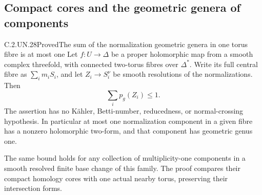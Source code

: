 \subsection{Compact cores and the geometric genera of components}

\begin{statement}{C.2.UN.28}{Proved}{The sum of the normalization geometric genera in one torus fibre is at most one}
Let $f:U\to\Delta$ be a proper holomorphic map from a
smooth complex threefold, with connected two-torus
fibres over $\Delta^*$. Write its full central fibre
as $\sum_i m_iS_i$, and let $Z_i\to S_i^\nu$ be
smooth resolutions of the normalizations. Then
\[
                         \sum_i p_g(Z_i)\le1.
                                                               \tag{C.PG.1}
\]
The assertion has no K\"ahler, Betti-number, reducedness,
or normal-crossing hypothesis. In particular at most
one normalization component in a given fibre has a
nonzero holomorphic two-form, and that component has
geometric genus one.

The same bound holds for any collection of multiplicity-one
components in a smooth resolved finite base change of
this family. The proof compares their compact homology
cores with one actual nearby torus, preserving their
intersection forms.
\end{statement}

